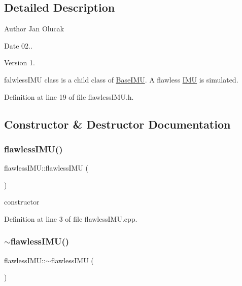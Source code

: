 \subsection{Detailed Description}
\begin{DoxyAuthor}{Author}
Jan Olucak 
\end{DoxyAuthor}
\begin{DoxyDate}{Date}
02.. 
\end{DoxyDate}
\begin{DoxyVersion}{Version}
1.
\end{DoxyVersion}
falwless\+I\+MU class is a child class of \hyperlink{class_base_i_m_u}{Base\+I\+MU}. A flawless \hyperlink{class_i_m_u}{I\+MU} is simulated. 

Definition at line 19 of file flawless\+I\+M\+U.\+h.



\subsection{Constructor \& Destructor Documentation}
\mbox{\label{classflawless_i_m_u_af9797255e5bf1192d011c66d0e22fdb8}} 
\subsubsection{\texorpdfstring{flawless\+I\+M\+U()}{flawlessIMU()}}
{\footnotesize\ttfamily flawless\+I\+M\+U\+::flawless\+I\+MU (\begin{DoxyParamCaption}{ }\end{DoxyParamCaption})}



constructor 



Definition at line 3 of file flawless\+I\+M\+U.\+cpp.

\mbox{\label{classflawless_i_m_u_ac9505afdbe3f879d0788c96b5a341982}} 
\subsubsection{\texorpdfstring{$\sim$flawless\+I\+M\+U()}{~flawlessIMU()}}
{\footnotesize\ttfamily flawless\+I\+M\+U\+::$\sim$flawless\+I\+MU (\begin{DoxyParamCaption}{ }\end{DoxyParamCaption})}



